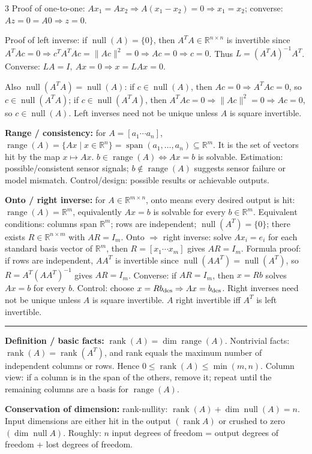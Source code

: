 \documentclass[10pt]{article}
\newcommand{\sect}[1]{\vspace{0.9pt}{\fontsize{7.2}{7.5}\selectfont\textbf{#1}}\vspace{0.25pt}\hrule\vspace{0.8pt}}
\newcommand{\sub}[1]{\textbf{#1}}
\newcommand{\R}{\mathbb{R}}
\newcommand{\rank}{\operatorname{rank}}
\newcommand{\range}{\operatorname{range}}
\newcommand{\nullsp}{\operatorname{null}}
\begin{document}
\begin{multicols*}{3}
Proof of one-to-one: \(Ax_1=Ax_2\Rightarrow
A(x_1-x_2)=0\Rightarrow x_1=x_2\); converse:
\(Az=0=A0\Rightarrow z=0\).

Proof of left inverse: if
\(\nullsp(A)=\{0\}\), then \(A^TA\in\R^{n\times n}\) is invertible since
\(A^TAc=0\Rightarrow c^TA^TAc=\|Ac\|^2=0\Rightarrow Ac=0\Rightarrow c=0\).
Thus \(L=(A^TA)^{-1}A^T\). Converse: \(LA=I,\ Ax=0\Rightarrow x=LAx=0\).

Also \(\nullsp(A^TA)=\nullsp(A)\): if \(c\in\nullsp(A)\), then
\(Ac=0\Rightarrow A^TAc=0\), so \(c\in\nullsp(A^TA)\); if
\(c\in\nullsp(A^TA)\), then \(A^TAc=0\Rightarrow
\|Ac\|^2=0\Rightarrow Ac=0\), so \(c\in\nullsp(A)\). Left inverses need
not be unique unless \(A\) is square invertible.

\sub{Range / consistency:} for \(A=[a_1\cdots a_n]\),
\(\range(A)=\{Ax\mid x\in\R^n\}=\operatorname{span}(a_1,\ldots,a_n)
\subseteq\R^m\). It is the set of vectors hit by the map \(x\mapsto Ax\).
\(b\in\range(A)\iff Ax=b\) is solvable. Estimation: possible/consistent
sensor signals; \(b\notin\range(A)\) suggests sensor failure or model
mismatch. Control/design: possible results or achievable outputs.

\sub{Onto / right inverse:} for \(A\in\R^{m\times n}\), onto means every
desired output is hit: \(\range(A)=\R^m\), equivalently \(Ax=b\) is
solvable for every \(b\in\R^m\). Equivalent conditions: columns span
\(\R^m\); rows are independent; \(\nullsp(A^T)=\{0\}\); there exists
\(R\in\R^{n\times m}\) with \(AR=I_m\). Onto \(\Rightarrow\) right
inverse: solve \(Ax_i=e_i\) for each standard basis vector of \(\R^m\),
then \(R=[x_1\cdots x_m]\) gives \(AR=I_m\). Formula proof: if rows are
independent, \(AA^T\) is invertible since
\(\nullsp(AA^T)=\nullsp(A^T)\), so \(R=A^T(AA^T)^{-1}\) gives
\(AR=I_m\). Converse: if \(AR=I_m\), then \(x=Rb\) solves \(Ax=b\) for
every \(b\). Control: choose \(x=Rb_{\rm des}\Rightarrow Ax=b_{\rm des}\).
Right inverses need not be unique unless \(A\) is square invertible.
\(A\) right invertible iff \(A^T\) is left invertible.

\sect{Rank}
\sub{Definition / basic facts:} \(\rank(A)=\dim\range(A)\). Nontrivial
facts: \(\rank(A)=\rank(A^T)\), and rank equals the maximum number of
independent columns or rows. Hence \(0\le\rank(A)\le\min(m,n)\). Column
view: if a column is in the span of the others, remove it; repeat until
the remaining columns are a basis for \(\range(A)\).

\sub{Conservation of dimension:} rank-nullity:
\(\rank(A)+\dim\nullsp(A)=n\). Input dimensions are either hit in the
output \((\rank A)\) or crushed to zero \((\dim\nullsp A)\). Roughly:
\(n\) input degrees of freedom = output degrees of freedom + lost
degrees of freedom.


\end{multicols*}
\end{document}
